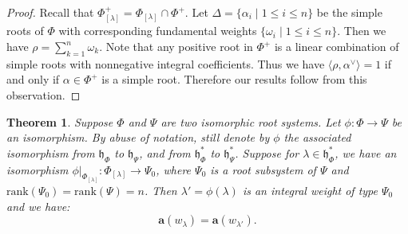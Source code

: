 \documentclass[reqno,12pt]{amsart}
\numberwithin{equation}{section}
\theoremstyle{plain}
\newtheorem{Thm}{Theorem}[section]
\theoremstyle{definition}
\newcommand{\lam}{\lambda}
\newcommand{\aff}{ \mathbf{a} }
\newcommand{\lest}{\leqslant}
\begin{document}
\begin{proof}
  Recall that $\Phi^+_{[\lam]}=\Phi_{[\lam]}\cap \Phi^+$. Let $\Delta=\{\alpha_i \mid  1\lest i\lest n\}$ be the simple roots of  $\Phi$ with corresponding fundamental weights $\{\omega_i\mid 1\lest i\lest n\}$. Then we  have $\rho=\sum\limits_{k=1}^n \omega_k$. Note that any positive root in $\Phi^+$ is a linear combination of simple roots with nonnegative integral coefficients. Thus we have $\langle \rho, \alpha^{\vee}\rangle=1$ if and only if $\alpha\in \Phi^+$ is a simple root. Therefore our results follow from this observation. 
\end{proof}



\begin{Thm}\label{transf}
    Suppose  $\Phi$ and $  \Psi$ are two isomorphic root systems. Let $\phi: \Phi \rightarrow \Psi$ be an isomorphism. By abuse of notation, still denote by $\phi$ the associated isomorphism  from $\mathfrak{h}_{\Phi}$ to $\mathfrak{h}_{\Psi}$, and from $\mathfrak{h}_{\Phi}^*$ to $\mathfrak{h}_{\Psi}^*$. Suppose for $\lam\in \mathfrak{h}_{\Phi}^*$, we have  an isomorphism  $\phi|_{\Phi_{[\lam]}}: \Phi_{[\lam]} \rightarrow \Psi_0 $, where $\Psi_0$ is a root subsystem of $\Psi$ and $\mathrm{rank} {(\Psi_0)}=\mathrm{rank} {(\Psi)}=n$. Then $\lam'=\phi(\lam)$ is an integral weight of type $\Psi_0$ and  we have: $$\aff(w_{\lam})=\aff(w_{\lam'}).$$

\end{Thm}
\end{document}
